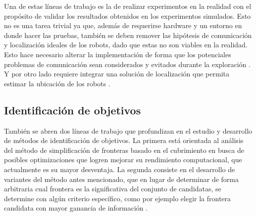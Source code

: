 Una de estas líneas de trabajo es la de realizar experimentos en la realidad 
con el propósito de validar los resultados obtenidos en los experimentos
simulados. Esto no es una tarea trivial ya que, además de requerirse hardware y
un entorno en donde hacer las pruebas, también se deben remover las hipótesis de
comunicación y localización ideales de los robots, dado que estas
no son viables en la realidad. Esto hace necesario alterar la
implementación de forma que los potenciales problemas de comunicación
sean considerados y evitados durante la exploración \cite{amigoni2017multirobot}. Y por otro lado requiere
integrar una solución de localización que permita estimar la ubicación de los
robots \cite{slam}. %

\subsection{Identificación de objetivos}


También se abren dos líneas de trabajo que profundizan en el estudio y
desarrollo de métodos de identificación de objetivos. La primera está orientada
al análisis del método de simplificación de fronteras basado en el cubrimiento
en busca de posibles optimizaciones que logren mejorar su rendimiento
computacional, que actualmente es su mayor desventaja. La segunda consiste en
el desarrollo de variantes del método antes mencionado, que en lugar de
determinar de forma arbitraria cual frontera es la significativa del conjunto
de candidatas, se determine con algún criterio específico, como por ejemplo elegir la
frontera candidata con mayor ganancia de información \cite{Amorin2019}.


